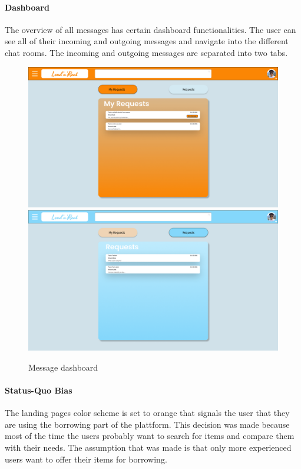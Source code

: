 	\paragraph{Dashboard}
		The overview of all messages has certain dashboard functionalities. The user can see all of their incoming and outgoing messages and navigate into the different chat rooms. The incoming and outgoing messages are separated into two tabs.
		\begin{figure}[H]
			\centering
			\includegraphics[width=0.49\linewidth]{abb/3_design_guidelines/messages_1.png}
			\includegraphics[width=0.49\linewidth]{abb/3_design_guidelines/messages_2.png}
			\caption{Message dashboard}
			\label{fig:message_dashboard}
		\end{figure}
	\par
	
	\paragraph{Status-Quo Bias}
		The landing pages color scheme is set to orange that signals the user that they are using the borrowing part of the plattform. This decision was made because most of the time the users probably want to search for items and compare them with their needs. The assumption that was made is that only more experienced users want to offer their items for borrowing.
	\par
	
